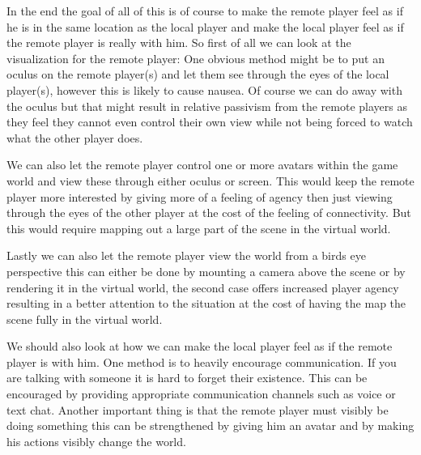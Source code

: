 	In the end the goal of all of this is of course to make the remote player feel
	as if he is in the same location as the local player and make the local player feel
	as if the remote player is really with him. So first of all we can look at the
	visualization for the remote player:
	One obvious method might be to put an oculus on the remote player(s) and let
	them see through the eyes of the local player(s), however this is likely to cause nausea.
	Of course we can do away with the oculus but that might result in relative passivism from
	the remote players as they feel they cannot even control their own view while not being
	forced to watch what the other player does.

	We can also let the remote player control one or more avatars within the game world
	and view these through either oculus or screen. This would keep the remote player
	more interested by giving more of a feeling of agency then just viewing through the eyes
	of the other player at the cost of the feeling of connectivity. But this would require
	mapping out a large part of the scene in the virtual world.

	Lastly we can also let the remote player view the world from a birds eye perspective
	this can either be done by mounting a camera above the scene or by rendering it in
	the virtual world, the second case offers increased player agency resulting in
	a better attention to the situation at the cost of having the map the scene fully
	in the virtual world.

	We should also look at how we can make the local player feel as if the remote
	player is with him. One method is to heavily encourage communication. If you
	are talking with someone it is hard to forget their existence. This can be
	encouraged by providing appropriate communication channels such as voice or text
	chat. Another important thing is that the remote player must visibly be doing something
	this can be strengthened by giving him an avatar and by making his actions visibly
	change the world.
